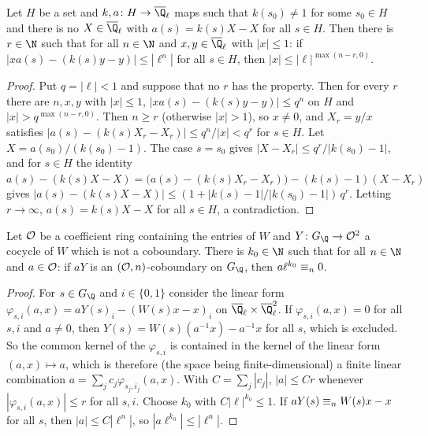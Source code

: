 \begin{lemma}\label{pf:kato:depth}
Let $H$ be a set and $k,a\colon H\to\katoQlb$ maps such that $k(s_0)\ne1$ for some $s_0\in H$ and there is no $X\in\katoQlb$ with
$a(s)=k(s)X-X$ for all $s\in H$. Then there is $r\in\N$ such that for all $n\in\N$ and $x,y\in\katoQlb$ with $|x|\le1$: if
$|xa(s)-(k(s)y-y)|\le|\ell^n|$ for all $s\in H$, then $|x|\le|\ell|^{\max(n-r,0)}$.
\end{lemma}

\begin{proof}
Put $q=|\ell|<1$ and suppose that no $r$ has the property. Then for every $r$ there are $n,x,y$ with $|x|\le1$,
$|xa(s)-(k(s)y-y)|\le q^n$ on $H$ and $|x|>q^{\max(n-r,0)}$. Then $n\ge r$ (otherwise $|x|>1$), so $x\ne0$, and $X_r=y/x$ satisfies
$|a(s)-(k(s)X_r-X_r)|\le q^n/|x|<q^r$ for $s\in H$. Let $X=a(s_0)/(k(s_0)-1)$. The case $s=s_0$ gives $|X-X_r|\le q^r/|k(s_0)-1|$, and
for $s\in H$ the identity $a(s)-(k(s)X-X)=\bigl(a(s)-(k(s)X_r-X_r)\bigr)-(k(s)-1)(X-X_r)$ gives
$|a(s)-(k(s)X-X)|\le(1+|k(s)-1|/|k(s_0)-1|)\,q^r$. Letting $r\to\infty$, $a(s)=k(s)X-X$ for all $s\in H$, a contradiction.
\end{proof}

\begin{lemma}\label{pf:kato:boundedtors}
Let $\mathcal{O}$ be a coefficient ring containing the entries of $W$ and $Y\colon G_\Q\to\katoO^2$ a cocycle of $W$ which is not a
coboundary. There is $k_0\in\N$ such that for all $n\in\N$ and $a\in\mathcal{O}$: if $aY$ is an $(\mathcal{O},n)$-coboundary on $G_\Q$, then
$a\ell^{k_0}\equiv_{n}0$.
\end{lemma}

\begin{proof}
For $s\in G_\Q$ and $i\in\{0,1\}$ consider the linear form $\varphi_{s,i}(a,x)=aY(s)_i-(W(s)x-x)_i$ on $\katoQlb\times\katoQlb^2$. If
$\varphi_{s,i}(a,x)=0$ for all $s,i$ and $a\ne0$, then $Y(s)=W(s)(a^{-1}x)-a^{-1}x$ for all $s$, which is excluded. So the common
kernel of the $\varphi_{s,i}$ is contained in the kernel of the linear form $(a,x)\mapsto a$, which is therefore (the space being
finite-dimensional) a finite linear combination $a=\sum_jc_j\varphi_{s_j,i_j}(a,x)$. With $C=\sum_j|c_j|$, $|a|\le Cr$ whenever
$|\varphi_{s,i}(a,x)|\le r$ for all $s,i$. Choose $k_0$ with $C|\ell|^{k_0}\le1$. If $aY(s)\equiv_{n}W(s)x-x$ for all $s$, then
$|a|\le C|\ell^n|$, so $|a\ell^{k_0}|\le|\ell^n|$.
\end{proof}

